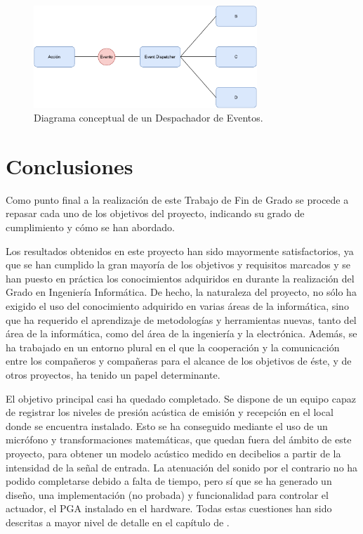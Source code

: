 \begin{figure}[h]
    \centering
    \includegraphics[width=0.75\textwidth]{figuras/event-dispatcher.pdf}
    \caption{Diagrama conceptual de un Despachador de Eventos.}
    \label{fig:event-dispatcher}
\end{figure}

\section{Conclusiones}

Como punto final a la realización de este Trabajo de Fin de Grado se procede a repasar cada uno de los objetivos del proyecto, indicando su grado de cumplimiento y cómo se han abordado.

Los resultados obtenidos en este proyecto han sido mayormente satisfactorios, ya que se han cumplido la gran mayoría de los objetivos y requisitos marcados y se han puesto en práctica los conocimientos adquiridos en durante la realización del Grado en Ingeniería Informática. De hecho, la naturaleza del proyecto, no sólo ha exigido el uso del conocimiento adquirido en varias áreas de la informática, sino que ha requerido el aprendizaje de metodologías y herramientas nuevas, tanto del área de la informática, como del área de la ingeniería y la electrónica. Además, se ha trabajado en un entorno plural en el que la cooperación y la comunicación entre los compañeros y compañeras para el alcance de los objetivos de éste, y de otros proyectos, ha tenido un papel determinante.

El objetivo principal casi ha quedado completado. Se dispone de un equipo capaz de registrar los niveles de presión acústica de emisión y recepción en el local donde se encuentra instalado. Esto se ha conseguido mediante el uso de un micrófono y transformaciones matemáticas, que quedan fuera del ámbito de este proyecto, para obtener un modelo acústico medido en decibelios a partir de la intensidad de la señal de entrada. La atenuación del sonido por el contrario no ha podido completarse debido a falta de tiempo, pero sí que se ha generado un diseño, una implementación (no probada) y funcionalidad para controlar el actuador, el PGA instalado en el hardware. Todas estas cuestiones han sido descritas a mayor nivel de detalle en el capítulo de .

